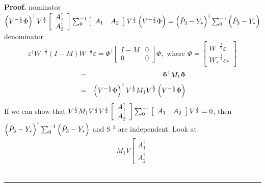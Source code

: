 \documentclass{article}
\newenvironment{proof}[1][Proof]{\noindent\textbf{#1.} }{\ \rule{0.5em}{0.5em}}
\begin{document}
\begin{proof}
nominator $\left( V^{-\frac{1}{2}}\Phi \right) ^{\dagger }V^{\frac{1}{2}}%
\left[ 
\begin{array}{c}
A_{1}^{\dagger } \\ 
A_{2}^{\dagger }%
\end{array}%
\right] \tsum\nolimits_{0}^{-1}\left[ 
\begin{array}{cc}
A_{1} & A_{2}%
\end{array}%
\right] V^{\frac{1}{2}}\left( V^{-\frac{1}{2}}\Phi \right) =\left( \hat{P}%
_{3}-Y_{\ast }\right) ^{\dagger }\tsum\nolimits_{0}^{-1}\left( \hat{P}%
_{3}-Y_{\ast }\right) $\newline
denominator 
\begin{equation*}
\varepsilon ^{\dagger }W^{-\frac{1}{2}}\left( I-M\right) W^{-\frac{1}{2}%
}\varepsilon =\Phi ^{\dagger }\left[ 
\begin{array}{cc}
I-M & 0 \\ 
0 & 0%
\end{array}%
\right] \Phi ,\text{ where }\Phi =\left[ 
\begin{array}{c}
W^{-\frac{1}{2}}\varepsilon  \\ 
W_{\ast }^{-\frac{1}{2}}\varepsilon _{\ast }%
\end{array}%
\right] 
\end{equation*}%
\begin{eqnarray*}
&=&\Phi ^{\dagger }M_{1}\Phi  \\
&=&\left( V^{-\frac{1}{2}}\Phi \right) ^{\dagger }V^{\frac{1}{2}}M_{1}V^{%
\frac{1}{2}}\left( V^{-\frac{1}{2}}\Phi \right) 
\end{eqnarray*}%
\newline
If we can show that $V^{\frac{1}{2}}M_{1}V^{\frac{1}{2}}V^{\frac{1}{2}}\left[
\begin{array}{c}
A_{1}^{\dagger } \\ 
A_{2}^{\dagger }%
\end{array}%
\right] \tsum\nolimits_{0}^{-1}\left[ 
\begin{array}{cc}
A_{1} & A_{2}%
\end{array}%
\right] V^{\frac{1}{2}}=0$, then $\left( \hat{P}_{3}-Y_{\ast }\right)
^{\dagger }\mathop{\textstyle \sum }\nolimits_{0}^{-1}\left( \hat{P}_{3}-Y_{\ast }\right) $ and S%
$^{2}$ are independent.\newline
Look at%
\begin{eqnarray*}
M_{1}V\left[ 
\begin{array}{c}
A_{1}^{\dagger } \\ 
A_{2}^{\dagger }%
\end{array}%

\end{eqnarray*}
\end{proof}
\end{document}
